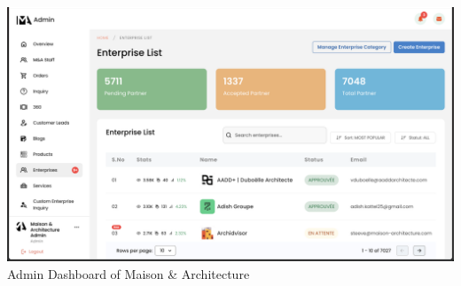 \begin{center}
    \includegraphics[width=1\linewidth]{contents/backmatter/images/admin-dashboard.png}\\[1ex]
    {\small Admin Dashboard of Maison \& Architecture}
\end{center}
